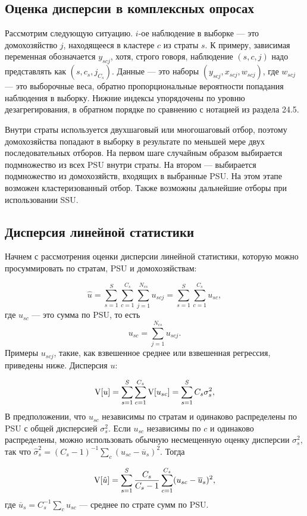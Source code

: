 \subsection{Оценка дисперсии в комплексных опросах}

Рассмотрим следующую ситуацию. $i$-ое наблюдение в выборке --- это домохозяйство $j$, находящееся в кластере $c$ из страты $s$. К примеру, зависимая переменная обозначается $y_{scj}$, хотя, строго говоря, наблюдение $(s, c, j)$ надо представлять как $(s, c_s, j_{C_s})$. Данные --- это наборы $(y_{scj}, x_{scj}, w_{scj})$, где $w_{scj}$ --- это выборочные веса, обратно пропорциональные вероятности попадания наблюдения в выборку. Нижние индексы упорядочены по уровню дезагрегирования, в обратном порядке по сравнению с нотацией из раздела 24.5. 

Внутри страты используется двухшаговый или многошаговый отбор, поэтому домохозяйства попадают в выборку в результате по меньшей мере двух последовательных отборов. На первом шаге случайным образом выбирается подмножество  из всех PSU внутри страты. На втором --- выбирается подмножество из домохозяйств, входящих в выбранные PSU. На этом этапе возможен кластеризованный отбор. Также возможны дальнейшие отборы при использовании SSU. 

\subsection*{Дисперсия линейной статистики}

Начнем с рассмотрения оценки дисперсии линейной статистики, которую можно просуммировать по стратам, PSU и домохозяйствам:

$$
\hat u = \sum_{s=1}^S \sum_{c=1}^{C_s} \sum_{j=1}^{N_{cs}} u_{scj} = \sum_{s=1}^S \sum_{c=1}^{C_s} u_{sc}, 
$$
где $u_{sc}$ --- это сумма по PSU, то есть
$$
u_{sc} = \sum_{j=1}^{N_{cs}} u_{scj}.
$$
Примеры $u_{scj}$, такие, как взвешенное среднее или взвешенная регрессия, приведены ниже. Дисперсия $u$:

$$
\mathrm{V}[u] = \sum_{s=1}^S \sum_{c=1}^{C_s} \mathrm{V}[u_{sc}] = \sum_{s=1}^S C_s \sigma^2_s, 
$$
В предположении, что $u_{sc}$ независимы по стратам и одинаково распределены по PSU с общей дисперсией $ \sigma^2_s$. Если $u_{sc}$ независимы по $c$ и одинаково распределены, можно использовать обычную несмещенную оценку дисперсии $ \sigma^2_s$, так что $\hat  \sigma^2_s = (C_s - 1)^{-1} \sum_c (u_{sc} - \overline{u}_s)^2$. Тогда 

\begin{equation}
\label{eq24.55}
\mathrm{V}[\hat u] = \sum_{s=1}^S \frac{C_s}{C_s - 1}  \sum_{c=1}^{C_s} (u_{sc} - \overline{u}_s)^2, 
\end{equation}
где $\overline{u}_s = C_s^{-1} \sum_c u_{sc}$ --- среднее по страте сумм по PSU. 

